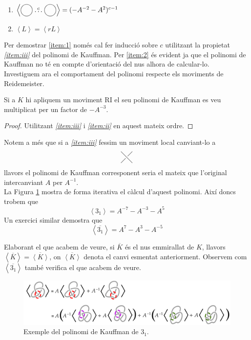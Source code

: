 \begin{enumerate}
	\item\label{item:1} $\left\langle\KPA\stackrel{c}{\dots}\KPA\right\rangle=(-A^{-2}-A^{2})^{c-1}$
	\item\label{item:2} $\left\langle L\right\rangle=\left\langle rL\right\rangle$
\end{enumerate}

Per demostrar \ref{item:1} només cal fer inducció sobre $c$ utilitzant la propietat \textit{\ref{item:iii}} del polinomi de Kauffman. Per \ref{item:2} és evident ja que el polinomi de Kauffman no té en compte d'orientació del nus alhora de calcular-lo.\\

Investiguem ara el comportament del polinomi respecte els moviments de Reidemeister.

\begin{lemma}\label{lem:RI}
	Si a $K$ hi apliquem un moviment RI el seu polinomi de Kauffman es veu multiplicat per un factor de $-A^{-3}$.
\end{lemma}

\begin{proof}
	Utilitzant \textit{\ref{item:iii}} i \textit{\ref{item:ii}} en aquest mateix ordre.
\end{proof}

Notem a més que si a \textit{\ref{item:iii}} fessim un moviment local canviant-lo a $$\KPI$$ llavors el polinomi de Kauffman corresponent seria el mateix que l'original intercanviant $A$ per $A^{-1}$.\\

La Figura \ref{fig:calculpolinomidekauffman} mostra de forma iterativa el càlcul d'aquest polinomi. Així doncs trobem que $$\left\langle 3_1\right\rangle=A^{-7}-A^{-3}-A^{5}$$ Un exercici similar demostra que $$\left\langle \overline{3_1}\right\rangle=A^{7}-A^{3}-A^{-5}$$

Elaborant el que acabem de veure, si $\overline{K}$ és el nus emmirallat de $K$, llavors $\left\langle\overline{K}\right\rangle=\overline{\left\langle K\right\rangle}$, on $\overline{\left\langle K\right\rangle}$ denota el canvi esmentat anteriorment. Observem com $\left\langle\overline{3_1}\right\rangle$ també verifica el que acabem de veure.

\begin{figure}
	\centering
	\includegraphics[width=\linewidth]{img/polinomidekauffman.png}
	\caption{Exemple del polinomi de Kauffman de $3_1$.}\label{fig:calculpolinomidekauffman}
\end{figure}

